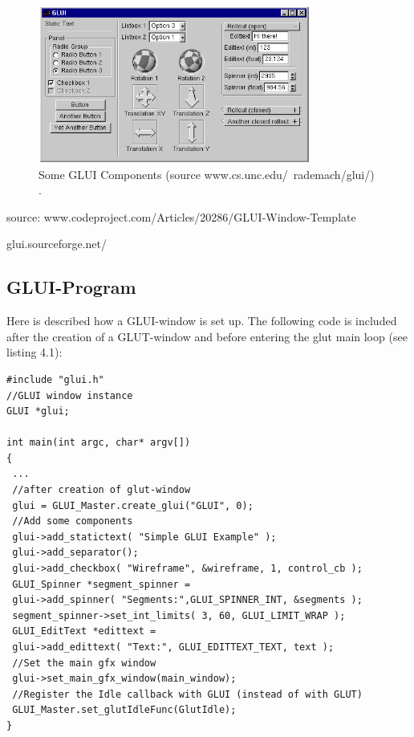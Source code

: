 \documentclass[10pt,a4paper,DIV=11]{scrreprt}
\begin{document}
\begin{center}
	\begin{figure}[H]
		\centering
		\includegraphics[width=0.8\textwidth,scale=1.0]{files/glui.png}  
		\caption{Some GLUI Components (source www.cs.unc.edu/~rademach/glui/) \cite{ogl-glui}.}
		\label{fig:ogl-glui}
	\end{figure}
\end{center}

source: www.codeproject.com/Articles/20286/GLUI-Window-Template

glui.sourceforge.net/


\subsection{GLUI-Program}

Here is described how a GLUI-window is set up.
The following code is included after the creation of a GLUT-window and before entering the glut main loop (see listing 4.1):


\begin{lstlisting}[caption={Creating a GLUI-window},label=lst:glui-create]
#include "glui.h"
//GLUI window instance
GLUI *glui;

int main(int argc, char* argv[])
{
 ...
 //after creation of glut-window
 glui = GLUI_Master.create_glui("GLUI", 0);
 //Add some components
 glui->add_statictext( "Simple GLUI Example" );
 glui->add_separator();
 glui->add_checkbox( "Wireframe", &wireframe, 1, control_cb );
 GLUI_Spinner *segment_spinner =
 glui->add_spinner( "Segments:",GLUI_SPINNER_INT, &segments );
 segment_spinner->set_int_limits( 3, 60, GLUI_LIMIT_WRAP );
 GLUI_EditText *edittext =
 glui->add_edittext( "Text:", GLUI_EDITTEXT_TEXT, text );
 //Set the main gfx window
 glui->set_main_gfx_window(main_window);
 //Register the Idle callback with GLUI (instead of with GLUT)
 GLUI_Master.set_glutIdleFunc(GlutIdle);
}
\end{lstlisting}
\end{document}
